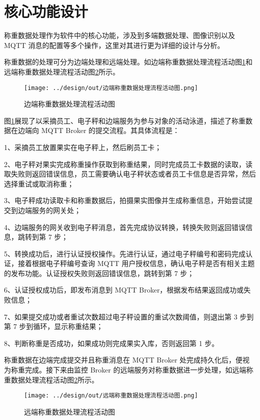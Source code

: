 \section{核心功能设计}\label{sec:keyFunction}

称重数据处理作为软件中的核心功能，涉及到多端数据处理、图像识别以及 MQTT 消息的配置等多个操作，这里对其进行更为详细的设计与分析。

称重数据的处理可分为边端处理和远端处理。如边端称重数据处理流程活动图\ref{fig:边端称重数据处理流程活动图}和远端称重数据处理流程活动图\ref{fig:远端称重数据处理流程活动图}所示。

\begin{figure}[H]
    \centering
    \texttt{[image: ../design/out/边端称重数据处理流程活动图.png]}
    \caption{边端称重数据处理流程活动图}
    \label{fig:边端称重数据处理流程活动图}
\end{figure}

图\ref{fig:边端称重数据处理流程活动图}展现了以采摘员工、电子秤和边端服务为参与对象的活动泳道，描述了称重数据在边端向 MQTT Broker 的提交流程。其具体流程是：

1、采摘员工放置果实在电子秤上，然后刷员工卡；

2、电子秤对果实完成称重操作获取到称重结果，同时完成员工卡数据的读取，读取失败则返回错误信息，员工需要确认电子秤状态或者员工卡信息是否异常，然后选择重试或取消称重；

3、电子秤成功读取卡和称重数据后，拍摄果实图像并生成称重信息，开始尝试提交到边端服务的网关处；

4、边端服务的网关收到电子秤消息，首先完成协议转换，转换失败则返回错误信息，跳转到第 7 步；

5、转换成功后，进行认证授权操作。先进行认证，通过电子秤编号和密码完成认证，接着根据电子秤编号查询 MQTT 用户授权信息，确认电子秤是否有相关主题的发布功能。认证授权失败则返回错误信息，跳转到第 7 步；

6、认证授权成功后，即发布消息到 MQTT Broker，根据发布结果返回成功或失败信息；

7、如果提交成功或者重试次数超过电子秤设置的重试次数阈值，则退出第 3 步到第 7 步到循环，显示称重结果；

8、判断称重是否成功，如果成功则完成果实入库，否则返回第 1 步。

称重数据在边端完成提交并且称重消息在 MQTT Broker 处完成持久化后，便视为称重完成。接下来由监控 Broker 的远端服务对称重数据进一步处理，如远端称重数据处理流程活动图\ref{fig:远端称重数据处理流程活动图}所示。

\begin{figure}[H]
    \centering
    \texttt{[image: ../design/out/远端称重数据处理流程活动图.png]}
    \caption{远端称重数据处理流程活动图}
    \label{fig:远端称重数据处理流程活动图}
\end{figure}

